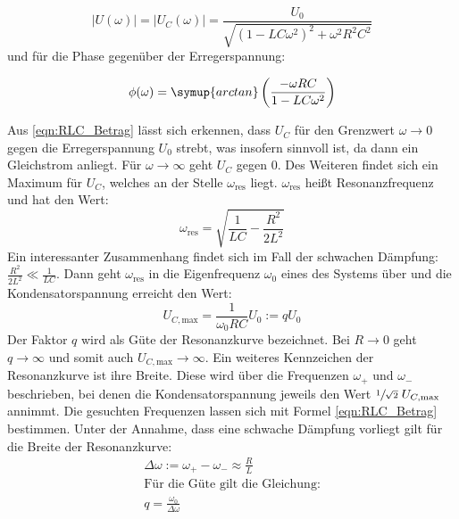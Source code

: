 \begin{equation}
    \label{eqn:RLC_Betrag}
    |U(\omega)| = |U_C(\omega)| = \frac{U_0}{\sqrt{(1-LC\omega^2)^2+\omega^2R^2C^2}}
\end{equation}
und für die Phase gegenüber der Erregerspannung:

\begin{equation}
    \label{eqn:RLC_Phase}
    \phi(\omega) = \symup{arctan}\left(\frac{-\omega RC}{1-LC\omega^2}\right)
\end{equation}

Aus \eqref{eqn:RLC_Betrag} lässt sich erkennen, dass $U_C$ für den Grenzwert $\omega \to 0$ gegen die Erregerspannung $U_0$
strebt, was insofern sinnvoll ist, da dann ein Gleichstrom anliegt. Für $\omega \to \infty$ geht $U_C$ gegen 0.
Des Weiteren findet sich ein Maximum für $U_C$, welches an der Stelle $\omega_{\text{res}}$ liegt.
$\omega_{\text{res}}$ heißt Resonanzfrequenz und hat den Wert:
\begin{equation}
    \label{eqn:Resonanzfrequenz}
    \omega_{\text{res}} = \sqrt{\frac{1}{LC}-\frac{R^2}{2L^2}}
\end{equation}
Ein interessanter Zusammenhang findet sich im Fall der schwachen Dämpfung: $\frac{R^2}{2L^2} \ll \frac{1}{LC}$. Dann geht $\omega_{\text{res}}$ 
in die Eigenfrequenz $\omega_0$ eines des Systems über und die Kondensatorspannung erreicht den Wert: 
\begin{equation}
    \label{eqn:Guete_Resonanzkurve}
    U_{C, \text{max}} = \frac{1}{\omega_0 RC} U_0 := q U_0
\end{equation}
Der Faktor $q$ wird als Güte der Resonanzkurve bezeichnet. Bei $R \to 0$ geht $q \to \infty$ und somit auch $U_{C, \text{max}} \to \infty$.
Ein weiteres Kennzeichen der Resonanzkurve ist ihre Breite. Diese wird über die Frequenzen $\omega_+$ und $\omega_-$ beschrieben, bei denen
die Kondensatorspannung jeweils den Wert $\sfrac{1}{\sqrt{2}}\; U_{C,\text{max}}$ annimmt. Die gesuchten Frequenzen lassen sich mit Formel
\eqref{eqn:RLC_Betrag} bestimmen. Unter der Annahme, dass eine schwache Dämpfung vorliegt gilt für die Breite der Resonanzkurve:
\begin{gather}
    \Delta\omega := \omega_+ - \omega_- \approx \frac{R}{L} \label{eqn:DeltaOmega} \\
    \text{Für die Güte gilt die Gleichung:} \nonumber \\
    q = \frac{\omega_0}{\Delta\omega}                       \label{eqn:Guete_Resonanzkurve2}
\end{gather}